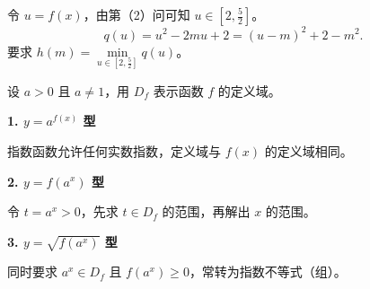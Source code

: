 \begin{frame}[t,label=B14a2]
  令 $u=f(x)$，由第（2）问可知 $u\in[2,\frac52]$。
  \[
    q(u)=u^2-2mu+2=(u-m)^2+2-m^2.
  \]
  要求 $h(m)=\min\limits_{u\in[2,\frac52]}q(u)$。
  \pause
\end{frame}

\begin{frame}[t,label=BmethodD]
  设 $a>0$ 且 $a\ne1$，用 $D_f$ 表示函数 $f$ 的定义域。
  \par\vspace{0.25cm}
  \textbf{1. $y=a^{f(x)}$ 型}
  \par 指数函数允许任何实数指数，定义域与 $f(x)$ 的定义域相同。
  \pause
  \par\vspace{0.25cm}
  \textbf{2. $y=f(a^x)$ 型}
  \par 令 $t=a^x>0$，先求 $t\in D_f$ 的范围，再解出 $x$ 的范围。
  \pause
  \par\vspace{0.25cm}
  \textbf{3. $y=\sqrt{f(a^x)}$ 型}
  \par 同时要求 $a^x\in D_f$ 且 $f(a^x)\ge0$，常转为指数不等式（组）。
\end{frame}

